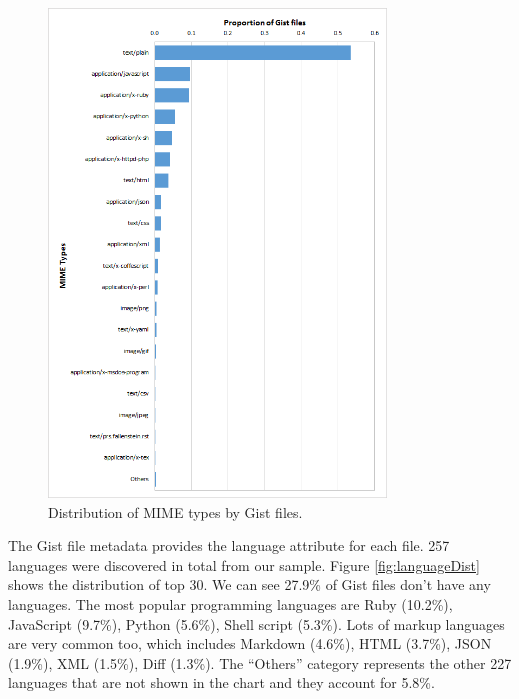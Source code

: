 \begin{figure}[!htbp]
	\centering
	\includegraphics[width=0.8\textwidth]{figures/typeDistribution.png}
	\caption{Distribution of MIME types by Gist files.}
	\label{fig:typeDist}
\end{figure}

The Gist file metadata provides the language attribute for each file. 257 languages were discovered in total from our sample. Figure \ref{fig:languageDist} shows the distribution of top 30. We can see 27.9\% of Gist files don't have any languages. The most popular programming languages are Ruby (10.2\%), JavaScript (9.7\%), Python (5.6\%), Shell script (5.3\%). Lots of markup languages are very common too, which includes Markdown (4.6\%), HTML (3.7\%), JSON (1.9\%), XML (1.5\%), Diff (1.3\%). The ``Others'' category represents the other 227 languages that are not shown in the chart and they account for 5.8\%. 

